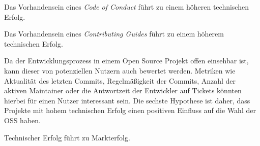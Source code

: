 \begin{hypothesis}
    Das Vorhandensein eines \textit{Code of Conduct} führt zu einem höheren technischen Erfolg.
    \label{H:4}
\end{hypothesis}


\begin{hypothesis}
    Das Vorhandensein eines \textit{Contributing Guides} führt zu einem höherem technischen Erfolg.
    \label{H:5}
\end{hypothesis}


\noindent
Da der Entwicklungsprozess in einem Open Source Projekt offen einsehbar ist, kann dieser von potenziellen
Nutzern auch bewertet werden. Metriken wie Aktualität des letzten Commits, Regelmäßigkeit der Commits,
Anzahl der aktiven Maintainer oder die Antwortzeit der Entwickler auf Tickets
könnten hierbei für einen Nutzer interessant sein.
Die sechste Hypothese ist daher, dass Projekte mit hohem technischen Erfolg einen positiven Einfluss auf 
die Wahl der OSS haben.


\begin{hypothesis}
    Technischer Erfolg führt zu Markterfolg.
    \label{H:6}
\end{hypothesis}